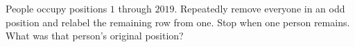 People occupy positions $1$ through $2019$. Repeatedly remove everyone in an odd position and relabel the remaining row from one. Stop when one person remains. What was that person's original position?
